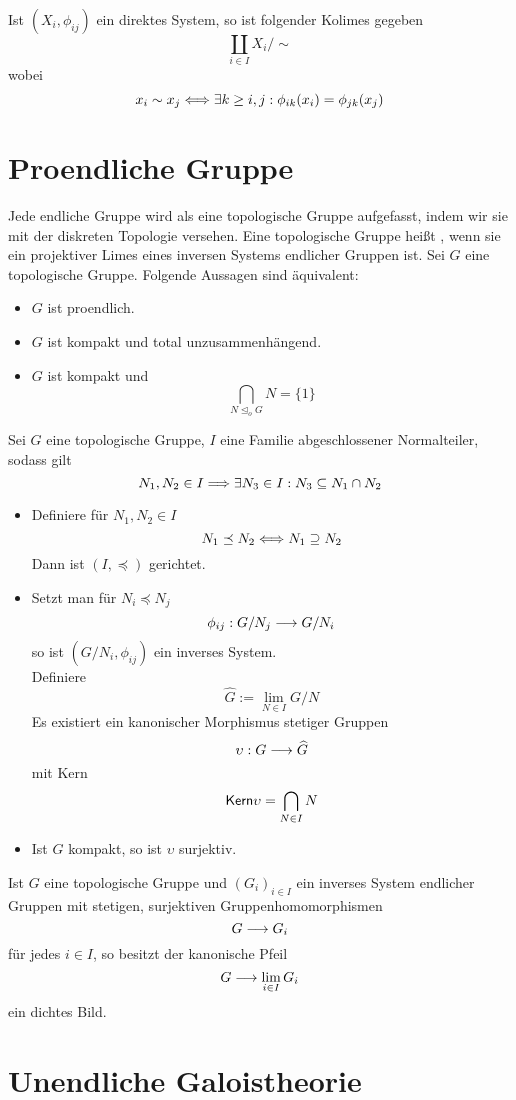 \documentclass{book}
\begin{document}
\Bem{}
Ist $(X_i,\phi_{ij})$ ein direktes System, so ist folgender Kolimes gegeben
\[ \coprod_{i\in I}X_i/\sim \]
wobei
\[ x_i \sim x_j \overset{}{\Longleftrightarrow} \exists k \geq i,j : \phi_{ik}(x_i) = \phi_{jk}(x_j) \]

\section{Proendliche Gruppe}
\Bem{}
Jede endliche Gruppe wird als eine topologische Gruppe aufgefasst, indem wir sie mit der diskreten Topologie versehen.
\Def{}
Eine topologische Gruppe heißt , wenn sie ein projektiver Limes eines inversen Systems endlicher Gruppen ist.
\Satz{}
Sei $G$ eine topologische Gruppe. Folgende Aussagen sind äquivalent:
\begin{itemize}
	\item $G$ ist proendlich.
	\item $G$ ist kompakt und total unzusammenhängend.
	\item $G$ ist kompakt und
	\[ \bigcap_{N\trianglelefteq_o G}N = \{1\} \]
\end{itemize}

\Lem{}
Sei $G$ eine topologische Gruppe, $I$ eine Familie abgeschlossener Normalteiler, sodass gilt
\[ N_1,N_2 \in I \overset{}{\Longrightarrow} \exists N_3 \in I: N_3 \subseteq N_1 \cap N_2 \]
\begin{itemize}
	\item Definiere für $N_1,N_2\in I$
	\[ N_1\preceq N_2 \overset{}{\Longleftrightarrow} N_1 \supseteq N_2 \]
	Dann ist $(I,\preceq)$ gerichtet.
	\item Setzt man für $N_i \preceq N_j$
	\[ \phi_{ij} : G/N_j \overset{}{\longrightarrow} G/N_i \]
	so ist $(G/N_i, \phi_{ij})$ ein inverses System.\\
	Definiere
	\[ \widehat{G} := \lim\limits_{N \in I}G/N \]
	Es existiert ein kanonischer Morphismus stetiger Gruppen
	\[ \upsilon : G \overset{}{\longrightarrow} \widehat{G} \]
	mit Kern
	\[\textsf{Kern} \upsilon = \bigcap_{N\in I}N \]
	\item Ist $G$ kompakt, so ist $\upsilon$ surjektiv.
\end{itemize}

\Lem{}
Ist $G$ eine topologische Gruppe und $(G_i)_{i\in I}$ ein inverses System endlicher Gruppen mit stetigen, surjektiven Gruppenhomomorphismen
\[ G \overset{}{\longrightarrow} G_i \]
für jedes $i \in I$, so besitzt der kanonische Pfeil
\[ G \overset{}{\longrightarrow} \lim_{i\in I} G_i \]
ein dichtes Bild.

\section{Unendliche Galoistheorie}
\end{document}

